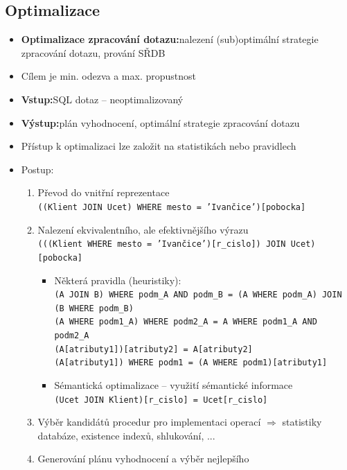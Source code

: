 \documentclass[a4paper,10pt]{article}
\newcommand{\pojem}[2]{\item \textbf{#1:}\quad #2}
\newcommand{\tedy}{$\Rightarrow$ }
\begin{document}
		\subsection{Optimalizace}
			\begin{itemize}
				\pojem{Optimalizace zpracování dotazu}{nalezení (sub)optimální strategie zpracování dotazu, prování SŘDB}
				\item Cílem je min. odezva a max. propustnost
				\pojem{Vstup}{SQL dotaz -- neoptimalizovaný}
				\pojem{Výstup}{plán vyhodnocení, optimální strategie zpracování dotazu}
				\item Přístup k optimalizaci lze založit na statistikách nebo pravidlech
				\item Postup:
				\begin{enumerate}
					\item Převod do vnitřní reprezentace \\
					\texttt{((Klient JOIN Ucet) WHERE mesto = 'Ivančice')[pobocka]}
					\item Nalezení ekvivalentního, ale efektivnějšího výrazu \\
					\texttt{(((Klient WHERE mesto = 'Ivančice')[r\_cislo]) JOIN Ucet)[pobocka]}
					\begin{itemize}
						\item Některá pravidla (heuristiky): \\
						\texttt{(A JOIN B) WHERE podm\_A AND podm\_B = (A WHERE podm\_A) JOIN (B WHERE podm\_B)} \\
						\texttt{(A WHERE podm1\_A) WHERE podm2\_A = A WHERE podm1\_A AND podm2\_A} \\
						\texttt{(A[atributy1])[atributy2] = A[atributy2]} \\
						\texttt{(A[atributy1]) WHERE podm1 = (A WHERE podm1)[atributy1]}
						\item Sémantická optimalizace -- využití sémantické informace \\
						\texttt{(Ucet JOIN Klient)[r\_cislo] = Ucet[r\_cislo]}
					\end{itemize}
					\item Výběr kandidátů procedur pro implementaci operací \tedy statistiky databáze, existence indexů, shlukování, ... 
					\item Generování plánu vyhodnocení a výběr nejlepšího
				\end{enumerate}
			\end{itemize}
			
\end{document}
